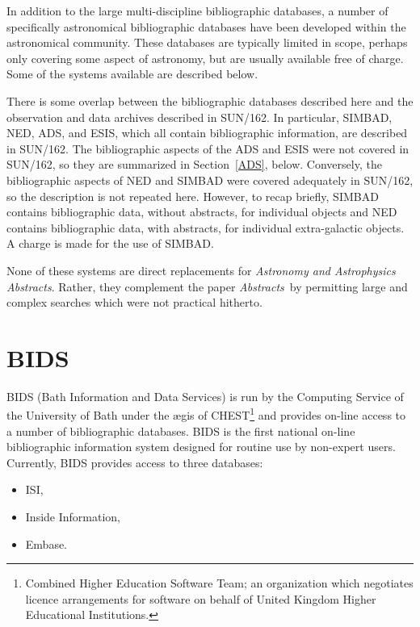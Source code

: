 \documentclass[twoside,11pt,nolof]{starlink}
\begin{document}
In addition to the large multi-discipline bibliographic databases, a
number of specifically astronomical bibliographic databases have been
developed within the astronomical community. These databases are
typically limited in scope, perhaps only covering some aspect of
astronomy, but are usually available free of charge. Some of the systems
available are described below.

There is some overlap between the bibliographic databases described here
and the observation and data archives described in SUN/162. In
particular, SIMBAD, NED, ADS, and ESIS, which all contain bibliographic
information, are described in SUN/162. The bibliographic aspects of the
ADS and ESIS were not covered in SUN/162, so they are summarized in
Section~\ref{ADS}, below. Conversely, the bibliographic aspects of NED
and SIMBAD were covered adequately in SUN/162, so the description is not
repeated here. However, to recap briefly, SIMBAD contains bibliographic
data, without abstracts, for individual objects and NED contains
bibliographic data, with abstracts, for individual extra-galactic
objects. A charge is made for the use of SIMBAD.

None of these systems are direct replacements for \textit{Astronomy and
Astrophysics Abstracts}. Rather, they complement the paper \textit{Abstracts}\, by permitting large and complex searches which were not
practical hitherto.


\section{BIDS
\label{BIDS}}

BIDS (Bath Information and Data Services) is run by the Computing
Service of the University of Bath under the \ae gis of
CHEST\footnote{Combined Higher Education Software Team; an organization
which negotiates licence arrangements for software on behalf of United
Kingdom Higher Educational Institutions.} and provides on-line access
to a number of bibliographic databases. BIDS is the first national
on-line bibliographic information system designed for routine use by
non-expert users. Currently, BIDS provides access to three databases:

\begin{itemize}

  \item ISI,

  \item Inside Information,

  \item Embase.

\end{itemize}
\end{document}
